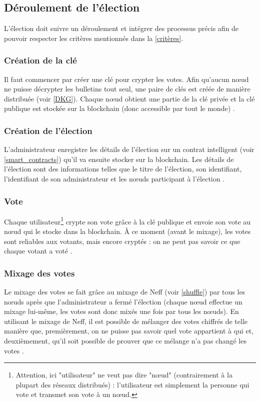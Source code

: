 \documentclass[10pt,a4paper,twoside]{article}
\numberwithin{equation}{section}
\begin{document}
	\subsection{Déroulement de l'élection}
		L'élection doit suivre un déroulement et intégrer des processus précis afin de pouvoir respecter les critères mentionnés dans la \autoref{critères}.
		
		\subsubsection{Création de la clé}
			Il faut commencer par créer une clé pour crypter les votes. Afin qu'aucun n\oe ud ne puisse décrypter les bulletins tout seul, une paire de clés est créée de manière distribuée (voir \autoref{DKG}). Chaque n\oe ud obtient une partie de la clé privée et la clé publique est stockée sur la blockchain (donc accessible par tout le monde) \cite{evoting_dela}.
			
		\subsubsection{Création de l'élection}
			L'administrateur enregistre les détails de l'élection sur un contrat intelligent (voir \autoref{smart_contracts}) qu'il va ensuite stocker sur la blockchain. Les détails de l'élection sont des informations telles que le titre de l'élection, son identifiant, l'identifiant de son administrateur et les n\oe uds participant à l'élection \cite{evoting_dela}.
			
		\subsubsection{Vote}
			Chaque utilisateur\footnote{Attention, ici "utilisateur" ne veut pas dire "n\oe ud" (contrairement à la plupart des réseaux distribués) : l'utilisateur est simplement la personne qui vote et transmet son vote à un n\oe ud.} crypte son vote grâce à la clé publique et envoie son vote au n\oe ud qui le stocke dans la blockchain. À ce moment (avant le mixage), les votes sont reliables aux votants, mais encore cryptés : on ne peut pas savoir ce que chaque votant a voté \cite{evoting_dela} \cite{interview}.
			
		\subsubsection{Mixage des votes}
			Le mixage des votes se fait grâce au mixage de Neff (voir \autoref{shuffle}) par tous les n\oe uds après que l'administrateur a fermé l'élection (chaque n\oe ud effectue un mixage lui-même, les votes sont donc mixés une fois par tous les n\oe uds). En utilisant le mixage de Neff, il est possible de mélanger des votes chiffrés de telle manière que, premièrement, on ne puisse pas savoir quel vote appartient à qui et, deuxièmement, qu'il soit possible de prouver que ce mélange n'a pas changé les votes \cite{evoting_dela} \cite{interview}. 
			
\end{document}

